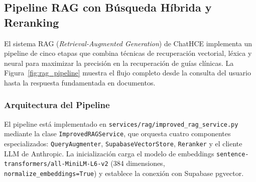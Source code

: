 

\subsection{Pipeline RAG con Búsqueda Híbrida y Reranking}
\label{sec:pipeline_rag}

El sistema RAG (\textit{Retrieval-Augmented Generation}) de ChatHCE implementa un pipeline de cinco etapas que combina técnicas de recuperación vectorial, léxica y neural para maximizar la precisión en la recuperación de guías clínicas. La Figura~\ref{fig:rag_pipeline} muestra el flujo completo desde la consulta del usuario hasta la respuesta fundamentada en documentos.

\subsubsection{Arquitectura del Pipeline}

El pipeline está implementado en \texttt{services/rag/improved\_rag\_service.py} mediante la clase \texttt{ImprovedRAGService}, que orquesta cuatro componentes especializados: \texttt{QueryAugmenter}, \texttt{SupabaseVectorStore}, \texttt{Reranker} y el cliente LLM de Anthropic. La inicialización carga el modelo de embeddings \texttt{sentence-transformers/all-MiniLM-L6-v2} (384 dimensiones, \texttt{normalize\_embeddings=True}) y establece la conexión con Supabase pgvector.

